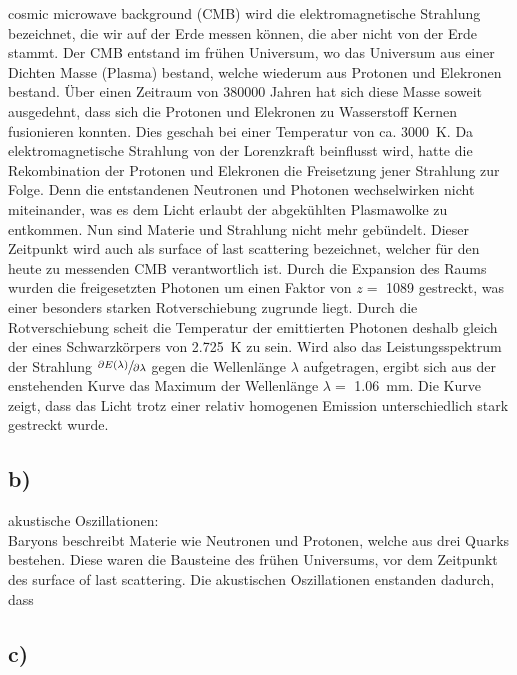     \justifying cosmic microwave background (CMB) wird die elektromagnetische Strahlung bezeichnet, die wir auf der Erde messen können, die aber nicht von der Erde stammt. 
    Der CMB entstand im frühen Universum, wo das Universum aus einer Dichten Masse (Plasma) bestand, welche wiederum aus Protonen und Elekronen bestand. Über einen Zeitraum von 380000 Jahren
    hat sich diese Masse soweit ausgedehnt, dass sich die Protonen und Elekronen zu Wasserstoff Kernen fusionieren konnten. Dies geschah bei einer Temperatur von ca. 
    \SI{3000}{\kelvin}. Da elektromagnetische Strahlung von der Lorenzkraft beinflusst wird, hatte die Rekombination der Protonen und Elekronen die Freisetzung jener Strahlung zur Folge.
    Denn die entstandenen Neutronen und Photonen wechselwirken nicht miteinander, was es dem Licht erlaubt der abgekühlten Plasmawolke zu entkommen. Nun sind Materie und Strahlung nicht
    mehr gebündelt. Dieser Zeitpunkt wird auch als surface of last scattering bezeichnet, welcher für den heute zu messenden CMB verantwortlich ist. Durch die Expansion des Raums 
    wurden die freigesetzten Photonen um einen Faktor von $z=$ 1089 gestreckt, was einer besonders starken Rotverschiebung zugrunde liegt. Durch die Rotverschiebung scheit die Temperatur der emittierten Photonen
    deshalb gleich der eines Schwarzkörpers von \SI{2.725}{\kelvin} zu sein. Wird also das Leistungsspektrum der Strahlung $\sfrac{\partial E(\lambda)}{\partial \lambda}$ gegen die Wellenlänge
    $\lambda$ aufgetragen, ergibt sich aus der enstehenden Kurve das Maximum der Wellenlänge $\lambda=$ \SI{1.06}{\milli\meter}. Die Kurve zeigt, dass das Licht trotz einer relativ homogenen
    Emission unterschiedlich stark gestreckt wurde. 

\subsection{b)}

    \justifying akustische Oszillationen:\\
    Baryons beschreibt Materie wie Neutronen und Protonen, welche aus drei Quarks bestehen. Diese waren die Bausteine des frühen Universums, vor dem Zeitpunkt des surface of last scattering.
    Die akustischen Oszillationen enstanden dadurch, dass  

\subsection{c)}





